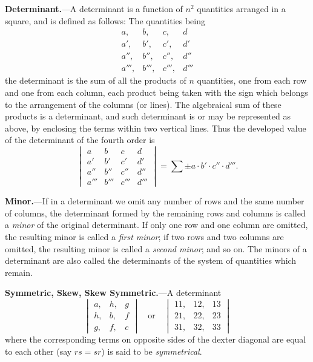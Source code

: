 \documentclass[11pt,a4paper]{book}
\begin{document}
\vspace{1em}

\noindent\textbf{Determinant.}---A determinant is a function of $n^2$ quantities arranged in a square, and is defined as follows: The quantities being
\[
\begin{array}{cccc}
a, & b, & c, & d \\
a', & b', & c', & d' \\
a'', & b'', & c'', & d'' \\
a''', & b''', & c''', & d'''
\end{array}
\]
the determinant is the sum of all the products of $n$ quantities, one from each row and one from each column, each product being taken with the sign which belongs to the arrangement of the columns (or lines). The algebraical sum of these products is a determinant, and such determinant is or may be represented as above, by enclosing the terms within two vertical lines. Thus the developed value of the determinant of the fourth order is
\[
\begin{vmatrix}
a & b & c & d \\
a' & b' & c' & d' \\
a'' & b'' & c'' & d'' \\
a''' & b''' & c''' & d'''
\end{vmatrix}
= \sum \pm a \cdot b' \cdot c'' \cdot d'''.
\]

\vspace{1em}

\noindent\textbf{Minor.}---If in a determinant we omit any number of rows and the same number of columns, the determinant formed by the remaining rows and columns is called a \textit{minor} of the original determinant. If only one row and one column are omitted, the resulting minor is called a \textit{first minor}; if two rows and two columns are omitted, the resulting minor is called a \textit{second minor}; and so on. The minors of a determinant are also called the determinants of the system of quantities which remain.

\vspace{1em}

\noindent\textbf{Symmetric, Skew, Skew Symmetric.}---A determinant
\[
\begin{vmatrix}
a, & h, & g \\
h, & b, & f \\
g, & f, & c
\end{vmatrix}
\quad\text{or}\quad
\begin{vmatrix}
11, & 12, & 13 \\
21, & 22, & 23 \\
31, & 32, & 33
\end{vmatrix}
\]
where the corresponding terms on opposite sides of the dexter diagonal are equal to each other (say $rs = sr$) is said to be \textit{symmetrical}.
\end{document}
